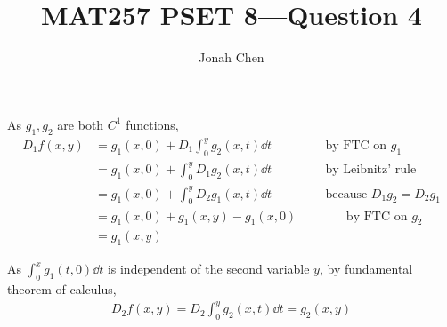 \documentclass{exam}
\title{MAT257 PSET 8---Question 4}
\author{Jonah Chen}
\date{}
\numberwithin{equation}{section}
\newcommand{\Comment}[1]{\:\:\:\:\:\:\:\:\:\:\:\:\:\:\:\:\:\:\text{#1}}
\begin{document}
    \sffamily
    \maketitle
    As $g_1, g_2$ are both $C^1$ functions,
    \begin{align*}
        D_1f(x,y)&=g_1(x,0)+D_1\int_0^yg_2(x,t)\dd t\Comment{  by FTC on }g_1\\
        &=g_1(x,0)+\int_0^yD_1g_2(x,t)\dd t\Comment{  by Leibnitz' rule}\\
        &=g_1(x,0)+\int_0^yD_2g_1(x,t)\dd t\Comment{  because } D_1g_2=D_2g_1\\
        &=g_1(x,0)+g_1(x,y)-g_1(x,0)\Comment{by FTC on }g_2\\
        &=g_1(x,y)
    \end{align*}

    As $\int_0^xg_1(t,0)\dd t$ is independent of the second variable $y$, by fundamental theorem of calculus,
    \begin{align*}
        D_2f(x,y)=D_2\int_0^yg_2(x,t)\dd t=g_2(x,y)
    \end{align*}
\end{document}
